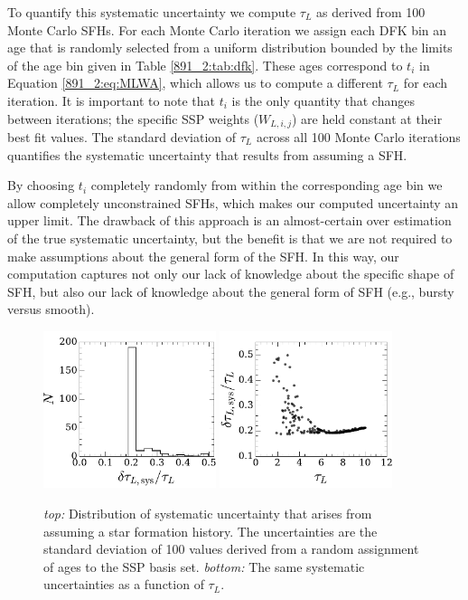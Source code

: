 To quantify this systematic uncertainty we compute $\tau_L$ as derived
from 100 Monte Carlo SFHs. For each Monte Carlo iteration we assign
each DFK bin an age that is randomly selected from a uniform
distribution bounded by the limits of the age bin given in Table
\ref{891_2:tab:dfk}. These ages correspond to $t_i$ in Equation
\ref{891_2:eq:MLWA}, which allows us to compute a different $\tau_L$ for
each iteration. It is important to note that $t_i$ is the only
quantity that changes between iterations; the specific SSP weights
($W_{L,i,j}$) are held constant at their best fit values. The standard
deviation of $\tau_L$ across all 100 Monte Carlo iterations quantifies
the systematic uncertainty that results from assuming a SFH.

By choosing $t_i$ completely randomly from within the corresponding age
bin we allow completely unconstrained SFHs, which makes our computed
uncertainty an upper limit. The drawback of this approach is an
almost-certain over estimation of the true systematic uncertainty, but
the benefit is that we are not required to make assumptions about the
general form of the SFH. In this way, our computation
captures not only our lack of knowledge about the specific shape of
SFH, but also our lack of knowledge about the general form of SFH
(e.g., bursty versus smooth).

\begin{figure}
  \centering
  \includegraphics[width=0.45\textwidth]{891_2/figs/sys_uncertainty_hist.pdf}
  \includegraphics[width=0.45\textwidth]{891_2/figs/sys_uncertainty.pdf}
  \caption[Distribution of systematic uncertainties in
    $\tau_L$]{\fixspacing\label{891_2:fig:sys_err}\emph{top:}
    Distribution of systematic uncertainty that arises from assuming a
    star formation history. The uncertainties are the standard
    deviation of 100 values derived from a random assignment of ages
    to the SSP basis set. \emph{bottom:} The same systematic
    uncertainties as a function of $\tau_L$.}
\end{figure}

